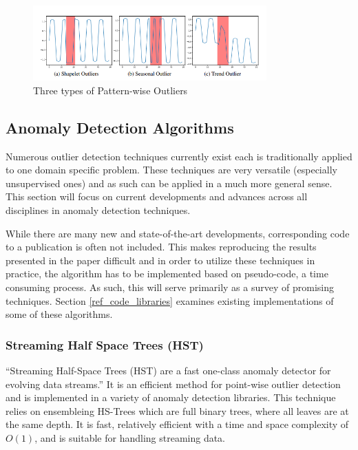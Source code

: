 \begin{figure}[H]
    \includegraphics[width=0.8\textwidth]{Images/contextual_outliers_graphic.PNG}
    \caption{Three types of Pattern-wise Outliers \parencite{lai2021revisiting}}
    \label{fig:contextual-outliers}
\end{figure}

\subsection{Anomaly Detection Algorithms}
\label{ref_anomaly_detection_alg}

Numerous outlier detection techniques currently exist each is traditionally applied to one domain specific problem. These techniques are very versatile (especially unsupervised ones) and as such can be applied in a much more general sense. This section will focus on current developments and advances across all disciplines in anomaly detection techniques.

While there are many new and state-of-the-art developments, corresponding code to a publication is often not included. This makes reproducing the results presented in the paper difficult and in order to utilize these techniques in practice, the algorithm has to be implemented based on pseudo-code, a time consuming process. As such, this will serve primarily as a survey of promising techniques. Section \ref{ref_code_libraries} examines existing implementations of some of these algorithms.

\subsubsection{Streaming Half Space Trees (HST)}
\enquote{Streaming Half-Space Trees (HST) are a fast one-class anomaly detector for evolving data streams.}\parencite{fast-anomaly-detection-streaming} It is an efficient method for point-wise outlier detection and is implemented in a variety of anomaly detection libraries. This technique relies on ensembleing HS-Trees which are full binary trees, where all leaves are at the same depth. It is fast, relatively efficient with a time and space complexity of $O(1)$, and is suitable for handling streaming data.

